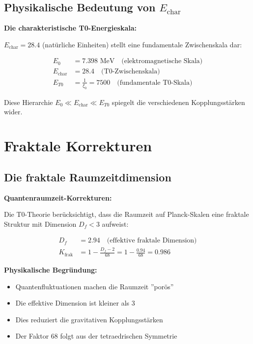 \documentclass[12pt,a4paper]{article}
\begin{document}
	\subsection{Physikalische Bedeutung von $E_{\text{char}}$}
	
	\begin{keyresult}
		\textbf{Die charakteristische T0-Energieskala:}
		
		$E_{\text{char}} = 28.4$ (natürliche Einheiten) stellt eine fundamentale Zwischenskala dar:
		
		\begin{align}
			E_0 &= 7.398 \text{ MeV} \quad \text{(elektromagnetische Skala)} \\
			E_{\text{char}} &= 28.4 \quad \text{(T0-Zwischenskala)} \\
			E_{T0} &= \frac{1}{\xi_0} = 7500 \quad \text{(fundamentale T0-Skala)}
		\end{align}
		
		Diese Hierarchie $E_0 \ll E_{\text{char}} \ll E_{T0}$ spiegelt die verschiedenen Kopplungsstärken wider.
	\end{keyresult}
	
	\section{Fraktale Korrekturen}
	
	\subsection{Die fraktale Raumzeitdimension}
	
	\begin{derivation}
		\textbf{Quantenraumzeit-Korrekturen:}
		
		Die T0-Theorie berücksichtigt, dass die Raumzeit auf Planck-Skalen eine fraktale Struktur mit Dimension $D_f < 3$ aufweist:
		
		\begin{align}
			D_f &= 2.94 \quad \text{(effektive fraktale Dimension)} \\
			K_{\text{frak}} &= 1 - \frac{D_f - 2}{68} = 1 - \frac{0.94}{68} = 0.986
		\end{align}
		
		\textbf{Physikalische Begründung:}
		\begin{itemize}
			\item Quantenfluktuationen machen die Raumzeit ''porös''
			\item Die effektive Dimension ist kleiner als 3
			\item Dies reduziert die gravitativen Kopplungsstärken
			\item Der Faktor 68 folgt aus der tetraedrischen Symmetrie
		\end{itemize}
	\end{derivation}
	
\end{document}
